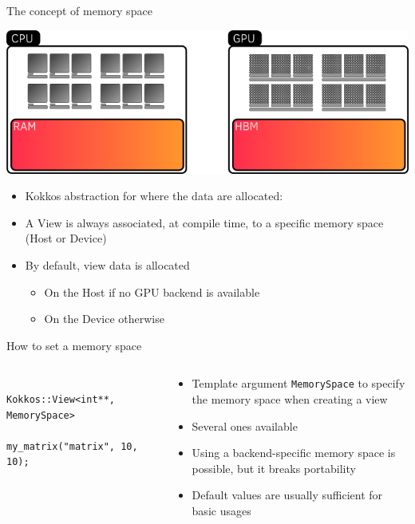 \documentclass[
    aspectratio=169,
    handout,
]{beamer}
\begin{document}

\begin{frame}{The concept of memory space}
    \begin{center}
        \includegraphics[width=0.7\linewidth]{memory_space.png}
    \end{center}
    \begin{itemize}
        \item Kokkos abstraction for where the data are allocated: 
        \item A View is always associated, at compile time, to a specific memory space (Host or Device)
        \item By default, view data is allocated
        \begin{itemize}
            \item On the Host if no GPU backend is available
            \item On the Device otherwise
        \end{itemize}
    \end{itemize}
\end{frame}


\begin{frame}[fragile]{How to set a memory space}
    \begin{columns}
        \begin{column}{0.5\linewidth}
            \begin{verbatim}
                Kokkos::View<int**, MemorySpace>
                    my_matrix("matrix", 10, 10);
            \end{verbatim}
        \end{column}
        \begin{column}{0.5\linewidth}
            \begin{itemize}
                \item Template argument \texttt{MemorySpace} to specify the memory space when creating a view
                \item Several ones available
                \item Using a backend-specific memory space is possible, but it breaks portability
                \item Default values are usually sufficient for basic usages
            \end{itemize}
        \end{column}
    \end{columns}
\end{frame}
\end{document}
